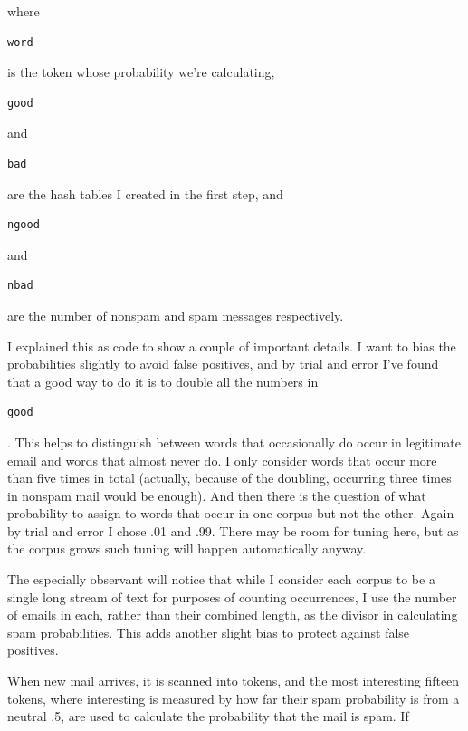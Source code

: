 where

\begin{verbatim}
word
\end{verbatim}

is the token whose probability we're calculating,

\begin{verbatim}
good
\end{verbatim}

and

\begin{verbatim}
bad
\end{verbatim}

are the hash tables I created in the first step, and

\begin{verbatim}
ngood
\end{verbatim}

and

\begin{verbatim}
nbad
\end{verbatim}

are the number of nonspam and spam messages respectively.

I explained this as code to show a couple of important details. I want
to bias the probabilities slightly to avoid false positives, and by
trial and error I've found that a good way to do it is to double all the
numbers in

\begin{verbatim}
good
\end{verbatim}

. This helps to distinguish between words that occasionally do occur in
legitimate email and words that almost never do. I only consider words
that occur more than five times in total (actually, because of the
doubling, occurring three times in nonspam mail would be enough). And
then there is the question of what probability to assign to words that
occur in one corpus but not the other. Again by trial and error I chose
.01 and .99. There may be room for tuning here, but as the corpus grows
such tuning will happen automatically anyway.

The especially observant will notice that while I consider each corpus
to be a single long stream of text for purposes of counting occurrences,
I use the number of emails in each, rather than their combined length,
as the divisor in calculating spam probabilities. This adds another
slight bias to protect against false positives.

When new mail arrives, it is scanned into tokens, and the most
interesting fifteen tokens, where interesting is measured by how far
their spam probability is from a neutral .5, are used to calculate the
probability that the mail is spam. If

